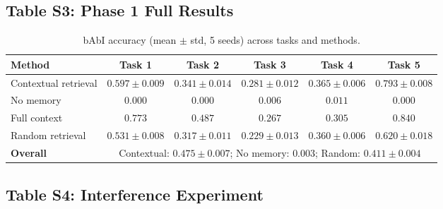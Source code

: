 \documentclass[11pt]{article}
\begin{document}
\subsection*{Table S3: Phase 1 Full Results}

\begin{table}[!ht]
\centering
\caption{bAbI accuracy (mean $\pm$ std, 5 seeds) across tasks and methods.}
\label{tab:phase1_full}
\small
\begin{tabular}{@{}lccccc@{}}
\toprule
\textbf{Method} & \textbf{Task 1} & \textbf{Task 2} & \textbf{Task 3} & \textbf{Task 4} & \textbf{Task 5} \\
\midrule
Contextual retrieval & $0.597 \pm 0.009$ & $0.341 \pm 0.014$ & $0.281 \pm 0.012$ & $0.365 \pm 0.006$ & $0.793 \pm 0.008$ \\
No memory & $0.000$ & $0.000$ & $0.006$ & $0.011$ & $0.000$ \\
Full context & $0.773$ & $0.487$ & $0.267$ & $0.305$ & $0.840$ \\
Random retrieval & $0.531 \pm 0.008$ & $0.317 \pm 0.011$ & $0.229 \pm 0.013$ & $0.360 \pm 0.006$ & $0.620 \pm 0.018$ \\
\midrule
\textbf{Overall} & \multicolumn{5}{c}{Contextual: $0.475 \pm 0.007$; No memory: $0.003$; Random: $0.411 \pm 0.004$} \\
\bottomrule
\end{tabular}
\end{table}

\subsection*{Table S4: Interference Experiment}
\end{document}
